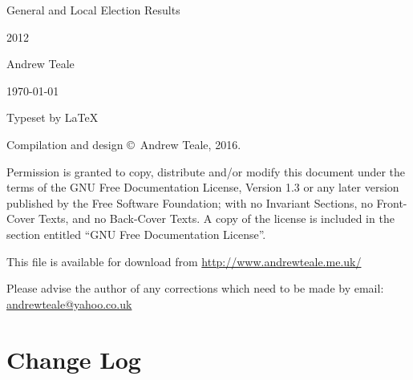 \documentclass[a4paper,openany]{book}
\begin{document}

\begin{titlepage}

\begin{center}

\Huge General and Local Election Results

2012

\bigskip

\Large Andrew Teale

\vfill

\newcommand\versionno{0.10.1}


\today

\end{center}

\end{titlepage}


\begin{center}

\bigskip

Typeset by \LaTeX{} 

\bigskip

Compilation and design \copyright\ Andrew Teale, 2016.

 Permission is granted to copy, distribute and/or modify this document
 under the terms of the GNU Free Documentation License, Version 1.3
 or any later version published by the Free Software Foundation;
 with no Invariant Sections, no Front-Cover Texts, and no Back-Cover Texts.
 A copy of the license is included in the section entitled ``GNU
 Free Documentation License''.

\bigskip

This file is available for download from
\url{http://www.andrewteale.me.uk/}

\bigskip

Please advise the author of any corrections which need to be made by
email: \url{andrewteale@yahoo.co.uk}

\vfill
\end{center}

\section*{Change Log}


%
\end{document}
